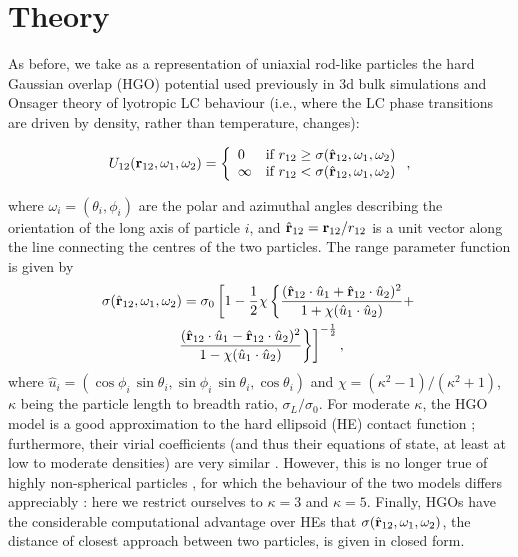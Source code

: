 \documentclass[aps,pre,twocolumn,groupedaddress,showpacs]{revtex4}
\begin{document}
\section{Theory}
\label{sect-theory}

As before, we take as a representation of uniaxial rod-like particles
the hard Gaussian overlap (HGO) potential used previously in 3d bulk 
simulations and Onsager theory of lyotropic LC behaviour 
\cite{Kike:1997,deMiguel:2001} (i.e., where the LC phase transitions 
are driven by density, rather than temperature, changes): 

\begin{equation}
\label{eq:gbp}
U_{12}({\bf r}_{12},\omega_1,\omega_2) = \left\{\begin{array}{ll}
0 &\mbox{if $r_{12} \geq \sigma(\hat{\bf r}_{12},\omega_1,\omega_2)$} \\
\infty & \mbox{if $r_{12} < \sigma(\hat{\bf r}_{12},\omega_1,\omega_2)$}
\end{array} \right. ,
\end{equation}

where $\omega_i=(\theta_i,\phi_i)$ are the polar and azimuthal angles 
describing the orientation of the long axis of particle $i$, and 
$\hat{\bf r}_{12}={\bf r}_{12}/r_{12}$ is a unit vector along the line
connecting the centres of the two particles. The range parameter function 
is given by
\begin{multline}
\label{eq:closest}
%
\sigma(\hat{\bf r}_{12},\omega_1,\omega_2) = 
\sigma_0  \left[ 1 - \frac{1}{2}\chi
\left\{ { {(\hat{\bf r}_{12}\cdot \hat u_1 +\hat{\bf r}_{12}\cdot\hat u_2)^2} \over{1+\chi(\hat u_1\cdot\hat u_2)}}+
\right. \right.\\
\left. \left.
{{(\hat{\bf r}_{12}\cdot\hat u_1 -\hat{\bf r}_{12}\cdot\hat u_2)^2} \over{1-\chi(\hat u_1\cdot\hat u_2)}} \right\} 
\right]^{-{1\over 2}},
\end{multline}
where $\hat u_i = (\cos\phi_i\,\sin\theta_i,\sin\phi_i\,
\sin\theta_i,\cos\theta_i)$ and $\chi = (\kappa^2 - 1)/(\kappa^2 + 1)$,
$\kappa$ being the particle length to breadth ratio, $\sigma_L/ \sigma_0$.
For moderate $\kappa$, the HGO model is a good approximation to the
hard ellipsoid (HE) contact function \cite{Perram:19XX,Allen:1993}; 
furthermore, their virial coefficients (and thus their equations of state,
at least at low to moderate densities) are very similar \cite{Steele:1987}. 
However, this is no longer true of highly non-spherical particles
\cite{Rigby}, for which the behaviour of the two models differs appreciably
\cite{deMiguel:2001}: here we restrict ourselves to $\kappa=3$ and $\kappa=5$.
Finally, HGOs have the considerable computational advantage over HEs that 
$\sigma(\hat{\bf r}_{12},\omega_1,\omega_2)$, the distance 
of closest approach between two particles, is given in closed form.
\end{document}
